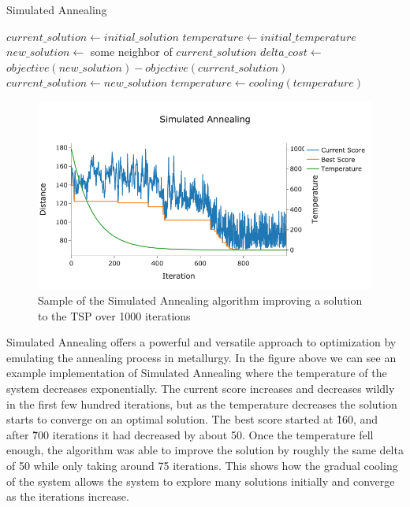 \documentclass{article}
\begin{document}
\begin{algorithm}[!h]
    \DontPrintSemicolon
    \caption{Simulated Annealing}
    \label{alg:anneal}
    \KwResult{}

    $current\_solution\gets initial\_solution$\;
    $temperature \gets initial\_temperature$\;
    {
        $new\_solution \gets$ some neighbor of $current\_solution$\;
        $delta\_cost \gets$ $objective(new\_solution) - objective(current\_solution)$\;
        {
            $current\_solution\gets new\_solution$\;
        }
        $temperature\gets cooling(temperature)$\;
    }
\end{algorithm}

\begin{figure}[h]
    \centering
    \includegraphics[width=1\textwidth,keepaspectratio]{SA.png}
    \caption{Sample of the Simulated Annealing algorithm improving a solution to the TSP over 1000 iterations}
    \label{fig:bandb}
\end{figure}

\noindent Simulated Annealing offers a powerful and versatile approach to optimization by emulating the annealing process in metallurgy. In the figure above we can see an example implementation of Simulated Annealing where the temperature of the system decreases exponentially. The current score increases and decreases wildly in the first few hundred iterations, but as the temperature decreases the solution starts to converge on an optimal solution. The best score started at \~160, and after \~700 iterations it had decreased by about 50. Once the temperature fell enough, the algorithm was able to improve the solution by roughly the same delta of 50 while only taking around 75 iterations. This shows how the gradual cooling of the system allows the system to explore many solutions initially and converge as the iterations increase.
\end{document}

